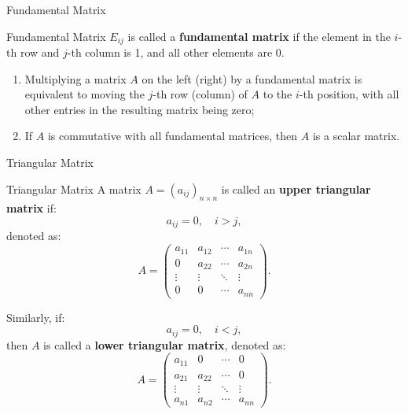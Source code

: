 \documentclass[11pt]{../../TexTemplate/elegantbook} %
\begin{document}
\begin{leftbarTitle}{Fundamental Matrix}\end{leftbarTitle}
\begin{definition}{Fundamental Matrix}
    \(E_{ij}\) is called a \textbf{fundamental matrix} if the element in the \(i\)-th row and \(j\)-th column is 1,
    and all other elements are 0.
\end{definition}

\begin{property}
    \begin{enumerate}
        \item Multiplying a matrix \(A\) on the left (right) by a fundamental matrix is equivalent to 
            moving the \(j\)-th row (column) of \(A\) to the \(i\)-th position, 
            with all other entries in the resulting matrix being zero; 
        \item If \(A\) is commutative with all fundamental matrices, then \(A\) is a scalar matrix.
    \end{enumerate}
\end{property}

\begin{leftbarTitle}{Triangular Matrix}\end{leftbarTitle}
\begin{definition}{Triangular Matrix}
    A matrix \( A = (a_{ij})_{n \times n} \) is called an \textbf{upper triangular matrix} if:
    \[
    a_{ij} = 0, \quad i > j,
    \]
    denoted as:
    \[
    A = 
    \begin{pmatrix}
    a_{11} & a_{12} & \cdots & a_{1n} \\
    0 & a_{22} & \cdots & a_{2n} \\
    \vdots & \vdots & \ddots & \vdots \\
    0 & 0 & \cdots & a_{nn}
    \end{pmatrix}.
    \]

    Similarly, if:
    \[
    a_{ij} = 0, \quad i < j,
    \]
    then \( A \) is called a \textbf{lower triangular matrix},
    denoted as:
    \[
    A = 
    \begin{pmatrix}
    a_{11} & 0 & \cdots & 0 \\
    a_{21} & a_{22} & \cdots & 0 \\
    \vdots & \vdots & \ddots & \vdots \\
    a_{n1} & a_{n2} & \cdots & a_{nn}
    \end{pmatrix}.
    \]
\end{definition}
\end{document}
